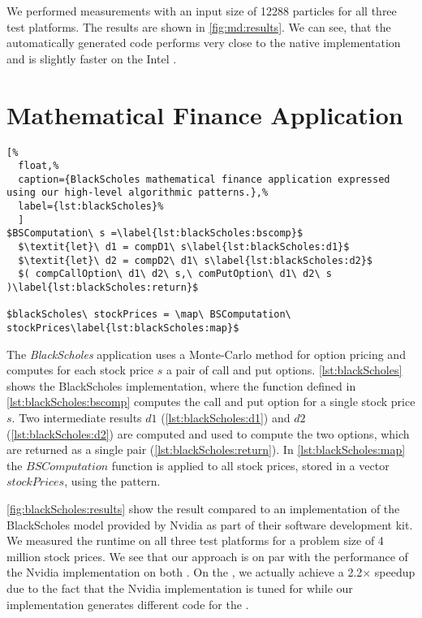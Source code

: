 We performed measurements with an input size of 12288 particles for all three test platforms.
The results are shown in \autoref{fig:md:results}.
We can see, that the automatically generated \OpenCL code performs very close to the native \OpenCL implementation and is slightly faster on the Intel \CPU.



\section{Mathematical Finance Application}

\begin{lstlisting}[%
  float,%
  caption={BlackScholes mathematical finance application expressed using our high-level algorithmic patterns.},%
  label={lst:blackScholes}%
  ]
$BSComputation\ s =\label{lst:blackScholes:bscomp}$
  $\textit{let}\ d1 = compD1\ s\label{lst:blackScholes:d1}$
  $\textit{let}\ d2 = compD2\ d1\ s\label{lst:blackScholes:d2}$
  $( compCallOption\ d1\ d2\ s,\ comPutOption\ d1\ d2\ s )\label{lst:blackScholes:return}$

$blackScholes\ stockPrices = \map\ BSComputation\ stockPrices\label{lst:blackScholes:map}$
\end{lstlisting}

The \emph{BlackScholes} application uses a Monte-Carlo method for option pricing and computes for each stock price $s$ a pair of call and put options.
\autoref{lst:blackScholes} shows the BlackScholes implementation, where the function defined in \autoref{lst:blackScholes:bscomp} computes the call and put option for a single stock price $s$.
Two intermediate results $d1$ (\autoref{lst:blackScholes:d1}) and $d2$ (\autoref{lst:blackScholes:d2}) are computed and used to compute the two options, which are returned as a single pair (\autoref{lst:blackScholes:return}).
In \autoref{lst:blackScholes:map} the $BSComputation$ function is applied to all stock prices, stored in a vector $stockPrices$, using the \map pattern.


\autoref{fig:blackScholes:results} show the result compared to an \OpenCL implementation of the BlackScholes model provided by Nvidia as part of their software development kit.
We measured the runtime on all three test platforms for a problem size of 4 million stock prices.
We see that our approach is on par with the performance of the Nvidia implementation on both \GPUs.
On the \CPU, we actually achieve a 2.2$\times$ speedup due to the fact that the Nvidia implementation is tuned for \GPUs while our implementation generates different code for the \CPU.







